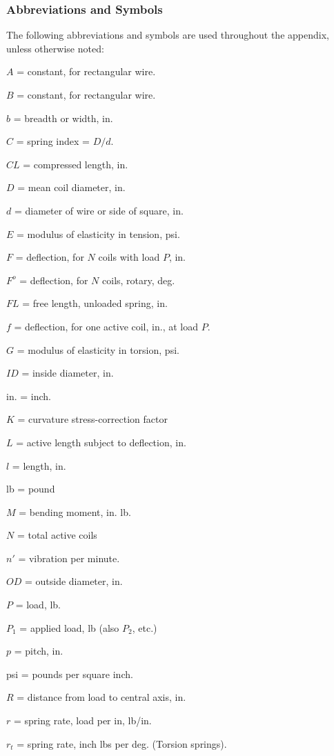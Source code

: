 \documentclass[10pt]{article}
\begin{document}
\subsubsection{Abbreviations and Symbols} %
The following abbreviations and symbols are used throughout the appendix, unless otherwise noted:

$A$ = constant, for rectangular wire.

$B$ = constant, for rectangular wire.

$b$ = breadth or width, in.

$C$ = spring index = $D/d$.

$CL$ = compressed length, in.

$D$ = mean coil diameter, in.

$d$ = diameter of wire or side of square, in.

$E$ = modulus of elasticity in tension, psi.

$F$ = deflection, for $N$ coils with load $P$, in.

$F^o$ = deflection, for $N$ coils, rotary, deg.

$FL$ = free length, unloaded spring, in.

$f$ = deflection, for one active coil, in., at load $P$.

$G$ = modulus of elasticity in torsion, psi.

$ID$ = inside diameter, in.

in. = inch.

$K$ = curvature stress-correction factor 

$L$ = active length subject to deflection, in.

$l$ = length, in.

lb = pound

$M$ = bending moment, in. lb.

$N$ = total active coils

$n'$ = vibration per minute.

$OD$ = outside diameter, in.

$P$ = load, lb.

$P_1$ = applied load, lb (also $P_2$, etc.)

$p$ = pitch, in.

psi = pounds per square inch.

$R$ = distance from load to central axis, in.

$r$ = spring rate, load per in, lb/in.

$r_t$ = spring rate, inch lbs per deg. (Torsion springs).
\end{document}
